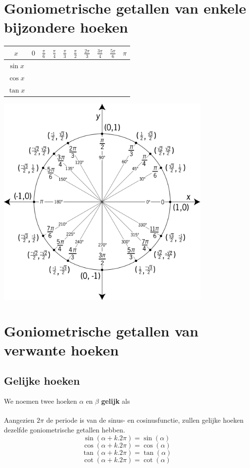 \documentclass[a4paper,12pt]{article}
\begin{document}
\section{Goniometrische getallen van enkele bijzondere hoeken}
\begin{center}
  \begin{tabular}{c|c|c|c|c|c|c|c|c|c}
    $x$ & $0$ & $\frac{\pi}{6}$ & $\frac{\pi}{4}$ &$\frac{\pi}{3}$ &$\frac{\pi}{2}$ &$\frac{2\pi}{3}$ &$\frac{3\pi}{4}$ &$\frac{5\pi}{6}$ & $\pi$ \\
    \hline
    $\sin x$&&&&&&&&&\\
    \hline
    $\cos x$&&&&&&&&&\\
    \hline
    $\tan x$&&&&&&&&&\\ 
  \end{tabular}
  \vfill
  \includegraphics[width=0.8\textwidth]{unit-circle} %
  \vfill
\end{center}


\pagebreak
\section{Goniometrische getallen van verwante hoeken}

\subsection{Gelijke hoeken}
We noemen twee hoeken $\alpha$ en $\beta$ \textbf{gelijk} als \arulefill
\paragraph{}
Aangezien $2\pi$ de periode is van de sinus- en cosinusfunctie, zullen gelijke hoeken dezelfde goniometrische getallen hebben.
\[\sin(\alpha+k.2\pi)=\sin(\alpha)
\]
\[\cos(\alpha +k.2\pi)=\cos(\alpha)
\]
\[\tan(\alpha+k.2\pi)=\tan(\alpha)
\]
\[\cot(\alpha +k.2\pi)=\cot(\alpha)
\]
\end{document}
